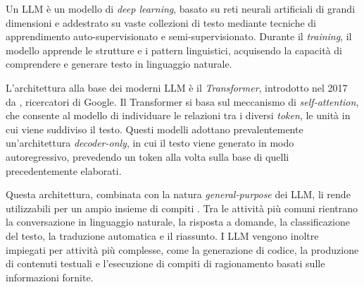 Un LLM è un modello di \emph{deep learning}, basato su reti neurali artificiali di grandi dimensioni e addestrato su vaste collezioni di testo mediante tecniche di apprendimento auto-supervisionato e semi-supervisionato. Durante il \emph{training}, il modello apprende le strutture e i pattern linguistici, acquisendo la capacità di comprendere e generare testo in linguaggio naturale.


L'architettura alla base dei moderni LLM è il \emph{Transformer}, introdotto nel 2017 da \textcite{google2017transformer}, ricercatori di Google. Il Transformer si basa sul meccanismo di \emph{self-attention}, che consente al modello di individuare le relazioni tra i diversi \emph{token}, le unità in cui viene suddiviso il testo. Questi modelli adottano prevalentemente un'architettura \emph{decoder-only}, in cui il testo viene generato in modo autoregressivo, prevedendo un token alla volta sulla base di quelli precedentemente elaborati. %


Questa architettura, combinata con la natura \emph{general-purpose} dei LLM, li rende utilizzabili per un ampio insieme di compiti \cite{li2024fundamental, dhamani2026genai}. Tra le attività più comuni rientrano la conversazione in linguaggio naturale, la risposta a domande, la classificazione del testo, la traduzione automatica e il riassunto. I LLM vengono inoltre impiegati per attività più complesse, come la generazione di codice, la produzione di contenuti testuali e l'esecuzione di compiti di ragionamento basati sulle informazioni fornite.



